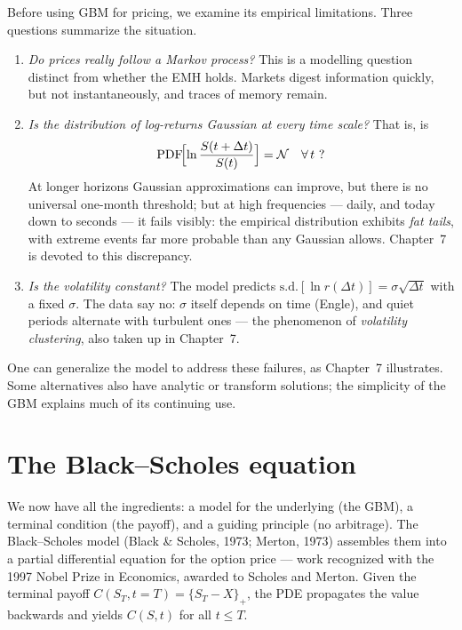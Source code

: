 Before using GBM for pricing, we examine its empirical limitations.
Three questions summarize the situation.
\begin{enumerate}
    \item \emph{Do prices really follow a Markov process?}
    This is a modelling question distinct from whether the EMH holds.
    Markets digest information quickly, but not instantaneously, and traces of memory remain.

    \item \emph{Is the distribution of log-returns Gaussian at every time scale?}
    That is, is
    \begin{equation}
    \mathrm{PDF}\!\Bigl[\ln\frac{S(t+\Delta t)}{S(t)}\Bigr] = \mathcal{N} \quad \forall\, t\ ?
    \end{equation}
    At longer horizons Gaussian approximations can improve, but there is no universal one-month threshold; but at high frequencies --- daily, and today down to seconds --- it fails visibly: the empirical distribution exhibits \emph{fat tails}, with extreme events far more probable than any Gaussian allows.
    Chapter~7 is devoted to this discrepancy.

    \item \emph{Is the volatility constant?}
    The model predicts $\mathrm{s.d.}[\ln r(\Delta t)] = \sigma\sqrt{\Delta t}$ with a fixed $\sigma$.
    The data say no: $\sigma$ itself depends on time (Engle\cite{Engle1982}), and quiet periods alternate with turbulent ones --- the phenomenon of \emph{volatility clustering}, also taken up in Chapter~7.
\end{enumerate}
One can generalize the model to address these failures, as Chapter~7 illustrates.
Some alternatives also have analytic or transform solutions; the simplicity of the GBM explains much of its continuing use.


\section{The Black--Scholes equation}\label{sec:black-scholes}

We now have all the ingredients: a model for the underlying (the GBM), a terminal condition (the payoff), and a guiding principle (no arbitrage).
The Black--Scholes model (Black \& Scholes, 1973; Merton, 1973)\cite{BlackScholes1973, Merton1973} assembles them into a partial differential equation for the option price --- work recognized with the 1997 Nobel Prize in Economics, awarded to Scholes and Merton.
Given the terminal payoff $C(S_T, t=T)=\{S_T-X\}_+$, the PDE propagates the value backwards and yields $C(S,t)$ for all $t\le T$.

